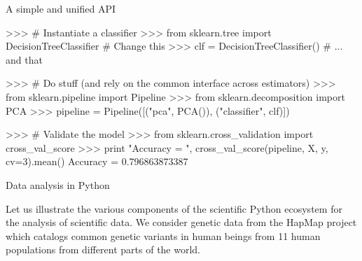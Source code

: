 \documentclass[final]{beamer}
\newcommand{\sklearn}{\textit{scikit-learn}\xspace}
\begin{document}
\begin{frame}[fragile]
\begin{textblock}{0.32}
\begin{block}{A simple and unified API \phantom{p}}
\begin{pythoncode}
>>> # Instantiate a classifier
>>> from sklearn.tree import DecisionTreeClassifier # Change this
>>> clf = DecisionTreeClassifier()                  # ... and that

>>> # Do stuff (and rely on the common interface across estimators)
>>> from sklearn.pipeline import Pipeline
>>> from sklearn.decomposition import PCA
>>> pipeline = Pipeline([("pca", PCA()), ("classifier", clf)])

>>> # Validate the model
>>> from sklearn.cross_validation import cross_val_score
>>> print "Accuracy = ", cross_val_score(pipeline, X, y, cv=3).mean()
Accuracy = 0.796863873387
\end{pythoncode}




\end{block}

\begin{block}{Data analysis in Python \phantom{p}}

Let us illustrate the various components of the scientific Python ecosystem
for the analysis of scientific data. We consider genetic data from the HapMap
project which catalogs common genetic variants in human beings from 11 human
populations from different parts of the world.


\vspace{0.3cm}


\end{block}
\end{textblock}
\end{frame}
\end{document}
